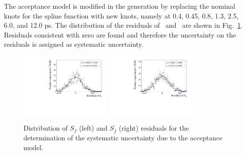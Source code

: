 The acceptance model is modified in the generation by replacing the nominal knots for the spline function with new knots,
namely at 0.4, 0.45, 0.8, 1.3, 2.5, 6.0, and 12.0 ps. The distribution of the residuals of
\Sf~and \Sfb~are shown in Fig.~\ref{fig:acceptanceSystToys}. Residuals consistent with zero are found
and therefore the uncertainty on the residuals is assigned as systematic uncertainty.
\begin{figure}[t]
	\begin{center}
		\includegraphics[width=0.4\textwidth]{06Systematics/figs/accept_Sf_res.pdf}
		\includegraphics[width=0.4\textwidth]{06Systematics/figs/accept_Sfbar_res.pdf}
	\end{center}
        \vspace{-2mm}
	\caption{Distribution of $S_f$ (left) and $S_{\bar f}$ (right) residuals for the determination of the systematic uncertainty due to the acceptance model.}
	\label{fig:acceptanceSystToys}
\end{figure}

